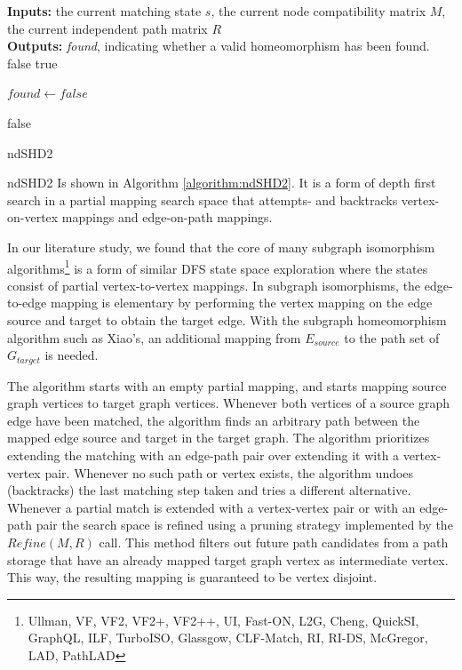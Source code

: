 \begin{algorithm}[H]
\SetAlgoLined
\textbf{Inputs: } the current matching state $s$, the current node compatibility matrix $M$, the current independent path matrix $R$\\
\textbf{Outputs: } \textit{found}, indicating whether a valid homeomorphism has been found.\\
 {
	\Return false\;
}  {
	\Return true\;
}

$\mathit{found} \longleftarrow \mathit{false}$

 \Return false\;
 \caption{ndSHD2}
 \label{algorithm:ndSHD2}
\end{algorithm}

ndSHD2 Is shown in Algorithm \ref{algorithm:ndSHD2}. It is a form of depth first search in a partial mapping search space that attempts- and backtracks vertex-on-vertex mappings and edge-on-path mappings.

In our literature study, we found that the core of many subgraph isomorphism algorithms\footnote{Ullman, VF, VF2, VF2+, VF2++, UI, Fast-ON, L2G, Cheng, QuickSI, GraphQL, ILF, TurboISO, Glassgow, CLF-Match, RI, RI-DS, McGregor, LAD, PathLAD} is a form of similar DFS state space exploration where the states consist of partial vertex-to-vertex mappings. In subgraph isomorphisms, the edge-to-edge mapping is elementary by performing the vertex mapping on the edge source and target to obtain the target edge. With the subgraph homeomorphism algorithm such as Xiao's, an additional mapping from $E_{source}$ to the path set of $G_{target}$ is needed.

The algorithm starts with an empty partial mapping, and starts mapping source graph vertices to target graph vertices. Whenever both vertices of a source graph edge have been matched, the algorithm finds an arbitrary path between the mapped edge source and target in the target graph. The algorithm prioritizes extending the matching with an edge-path pair over extending it with a vertex-vertex pair. Whenever no such path or vertex exists, the algorithm undoes (backtracks) the last matching step taken and tries a different alternative. Whenever a partial match is extended with a vertex-vertex pair or with an edge-path pair the search space is refined using a pruning strategy implemented by the $Refine(M,R)$ call. This method filters out future path candidates from a path storage that have an already mapped target graph vertex as intermediate vertex. This way, the resulting mapping is guaranteed to be vertex disjoint.

